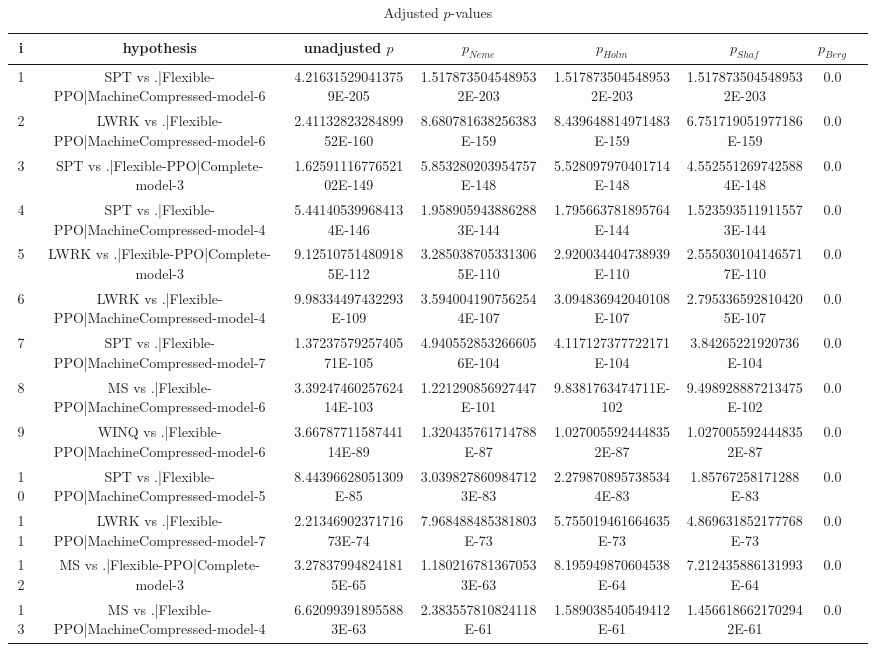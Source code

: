 \documentclass[a3paper,10pt]{article}
\begin{document}
\begin{table}[!htp]
\centering\tiny
\caption{Adjusted $p$-values}
\begin{tabular}{cccccccc}
i&hypothesis&unadjusted $p$&$p_{Neme}$&$p_{Holm}$&$p_{Shaf}$&$p_{Berg}$\\
\hline
1&SPT vs .|Flexible-PPO|MachineCompressed-model-6&4.216315290413759E-205&1.5178735045489532E-203&1.5178735045489532E-203&1.5178735045489532E-203&0.0\\
2&LWRK vs .|Flexible-PPO|MachineCompressed-model-6&2.4113282328489952E-160&8.680781638256383E-159&8.439648814971483E-159&6.751719051977186E-159&0.0\\
3&SPT vs .|Flexible-PPO|Complete-model-3&1.6259111677652102E-149&5.853280203954757E-148&5.528097970401714E-148&4.5525512697425884E-148&0.0\\
4&SPT vs .|Flexible-PPO|MachineCompressed-model-4&5.441405399684134E-146&1.9589059438862883E-144&1.795663781895764E-144&1.5235935119115573E-144&0.0\\
5&LWRK vs .|Flexible-PPO|Complete-model-3&9.125107514809185E-112&3.2850387053313065E-110&2.920034404738939E-110&2.5550301041465717E-110&0.0\\
6&LWRK vs .|Flexible-PPO|MachineCompressed-model-4&9.98334497432293E-109&3.5940041907562544E-107&3.094836942040108E-107&2.7953365928104205E-107&0.0\\
7&SPT vs .|Flexible-PPO|MachineCompressed-model-7&1.3723757925740571E-105&4.9405528532666056E-104&4.117127377722171E-104&3.84265221920736E-104&0.0\\
8&MS vs .|Flexible-PPO|MachineCompressed-model-6&3.3924746025762414E-103&1.221290856927447E-101&9.8381763474711E-102&9.498928887213475E-102&0.0\\
9&WINQ vs .|Flexible-PPO|MachineCompressed-model-6&3.6678771158744114E-89&1.320435761714788E-87&1.0270055924448352E-87&1.0270055924448352E-87&0.0\\
10&SPT vs .|Flexible-PPO|MachineCompressed-model-5&8.44396628051309E-85&3.0398278609847123E-83&2.2798708957385344E-83&1.85767258171288E-83&0.0\\
11&LWRK vs .|Flexible-PPO|MachineCompressed-model-7&2.2134690237171673E-74&7.968488485381803E-73&5.755019461664635E-73&4.869631852177768E-73&0.0\\
12&MS vs .|Flexible-PPO|Complete-model-3&3.278379948241815E-65&1.1802167813670533E-63&8.195949870604538E-64&7.212435886131993E-64&0.0\\
13&MS vs .|Flexible-PPO|MachineCompressed-model-4&6.620993918955883E-63&2.383557810824118E-61&1.589038540549412E-61&1.4566186621702942E-61&0.0\\

\end{tabular}
\end{table}
\end{document}
